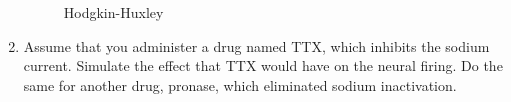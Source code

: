 \documentclass[11pt]{article}
\begin{document}
\begin{enumerate}
		\begin{figure}[ht]
			\centering
			\caption{Hodgkin-Huxley}
		\end{figure}
		
		\item Assume that you administer a drug named TTX, which inhibits the sodium current. Simulate the effect that TTX would have on the neural firing. Do the same for another drug, pronase, which eliminated sodium inactivation.
		

\end{enumerate}
\end{document}
